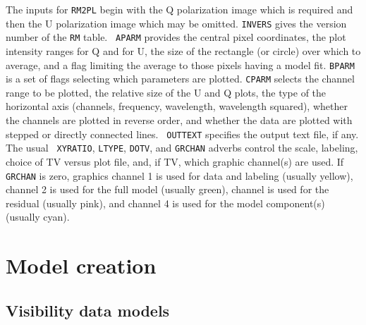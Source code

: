 \documentclass[twoside]{article}
\newcommand{\hblack}{\color{black}}
\begin{document}
The inputs for {\tt RM2PL} begin with the Q polarization image which
is required and then the U polarization image which may be omitted.
{\tt INVERS} gives the version number of the {\tt RM} table.  {\tt
  APARM} provides the central pixel coordinates, the plot intensity
ranges for Q and for U, the size of the rectangle (or circle) over
which to average, and a flag limiting the average to those pixels
having a model fit.  {\tt BPARM} is a set of flags selecting which
parameters are plotted.  {\tt CPARM} selects the channel range to be
plotted, the relative size of the U and Q plots, the type of the
horizontal axis (channels, frequency, wavelength, wavelength squared),
whether the channels are plotted in reverse order, and whether the
data are plotted with stepped or directly connected lines.  {\tt
  OUTTEXT} specifies the output text file, if any.  The usual {\tt
  XYRATIO}, {\tt LTYPE}, {\tt DOTV}, and {\tt   GRCHAN} adverbs
control the scale, labeling, choice of TV versus plot file, and, if
TV, which graphic channel(s) are used.  If {\tt GRCHAN} is zero,
graphics channel 1 is used for data and labeling (usually yellow),
channel 2 is used for the full model (usually green), channel is used
for the residual (usually pink), and channel 4 is used for the model
component(s) (usually cyan).

\hblack
\section{Model creation}

\subsection{Visibility data models}
\end{document}
